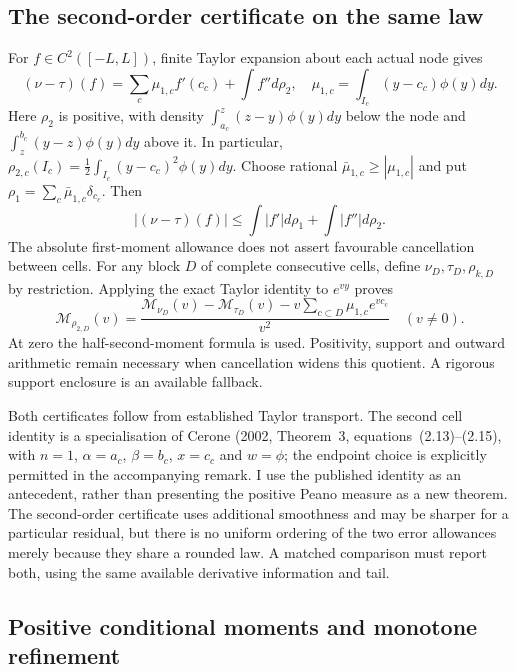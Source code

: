 \subsection{The second-order certificate on the same law}

For $f\in C^2([-L,L])$, finite Taylor expansion about each actual node
gives
\[
 (\nu-\tau)(f)=\sum_c\mu_{1,c}f'(c_c)+\int f''d\rho_2,
\quad
 \mu_{1,c}=\int_{I_c}(y-c_c)\phi(y)dy.
\]
Here $\rho_2$ is positive, with density
$\int_{a_c}^z(z-y)\phi(y)dy$ below the node and
$\int_z^{b_c}(y-z)\phi(y)dy$ above it. In particular,
$\rho_{2,c}(I_c)=\frac12\int_{I_c}(y-c_c)^2\phi(y)dy$.
Choose rational $\bar\mu_{1,c}\geq|\mu_{1,c}|$ and put
$\rho_1=\sum_c\bar\mu_{1,c}\delta_{c_c}$. Then
\[
 |(\nu-\tau)(f)|\leq\int |f'|d\rho_1+\int |f''|d\rho_2.
\]
The absolute first-moment allowance does not assert favourable
cancellation between cells. For any block $D$ of complete consecutive
cells, define $\nu_D,\tau_D,\rho_{k,D}$ by restriction. Applying
the exact Taylor identity to $e^{vy}$ proves
\[
 \mathcal M_{\rho_{2,D}}(v)=
 \frac{\mathcal M_{\nu_D}(v)-\mathcal M_{\tau_D}(v)
   -v\sum_{c\subset D}\mu_{1,c}e^{vc_c}}{v^2}
 \quad(v\neq0).
\]
At zero the half-second-moment formula is used. Positivity, support and
outward arithmetic remain necessary when cancellation widens this
quotient. A rigorous support enclosure is an available fallback.

Both certificates follow from established Taylor transport. The second
cell identity is a specialisation of Cerone (2002, Theorem~3,
equations~(2.13)--(2.15), with $n=1$, $\alpha=a_c$, $\beta=b_c$,
$x=c_c$ and $w=\phi$; the endpoint choice is explicitly permitted in
the accompanying remark. I use the published identity as an antecedent,
rather than presenting the positive Peano measure as a new theorem.
The second-order certificate
uses additional smoothness and may be sharper for a particular
residual, but there is no uniform ordering of the two error allowances
merely because they share a rounded law. A matched comparison must
report both, using the same available derivative information and tail.

\subsection{Positive conditional moments and monotone refinement}

